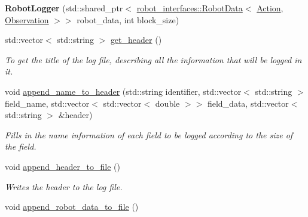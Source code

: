 \begin{DoxyCompactItemize}
\item 
{\bfseries Robot\+Logger} (std\+::shared\+\_\+ptr$<$ \hyperlink{classrobot__interfaces_1_1RobotData}{robot\+\_\+interfaces\+::\+Robot\+Data}$<$ \hyperlink{classAction}{Action}, \hyperlink{classObservation}{Observation} $>$$>$ robot\+\_\+data, int block\+\_\+size)\hypertarget{classrobot__interfaces_1_1RobotLogger_a40fbf613d2fd5a54dfd71a0dde9da616}{}\label{classrobot__interfaces_1_1RobotLogger_a40fbf613d2fd5a54dfd71a0dde9da616}

\item 
std\+::vector$<$ std\+::string $>$ \hyperlink{classrobot__interfaces_1_1RobotLogger_aff9a4e9a91b3fe604bd16a94a006e151}{get\+\_\+header} ()
\begin{DoxyCompactList}\small\item\em To get the title of the log file, describing all the information that will be logged in it. \end{DoxyCompactList}\item 
void \hyperlink{classrobot__interfaces_1_1RobotLogger_a7c94db4517002755f3325c13aa430733}{append\+\_\+name\+\_\+to\+\_\+header} (std\+::string identifier, std\+::vector$<$ std\+::string $>$ field\+\_\+name, std\+::vector$<$ std\+::vector$<$ double $>$$>$ field\+\_\+data, std\+::vector$<$ std\+::string $>$ \&header)
\begin{DoxyCompactList}\small\item\em Fills in the name information of each field to be logged according to the size of the field. \end{DoxyCompactList}\item 
void \hyperlink{classrobot__interfaces_1_1RobotLogger_a8c7c9b7bff6e49b340c90b36bee9331e}{append\+\_\+header\+\_\+to\+\_\+file} ()\hypertarget{classrobot__interfaces_1_1RobotLogger_a8c7c9b7bff6e49b340c90b36bee9331e}{}\label{classrobot__interfaces_1_1RobotLogger_a8c7c9b7bff6e49b340c90b36bee9331e}

\begin{DoxyCompactList}\small\item\em Writes the header to the log file. \end{DoxyCompactList}\item 
void \hyperlink{classrobot__interfaces_1_1RobotLogger_ac568cd79a651c2c20fa9e1f136155ced}{append\+\_\+robot\+\_\+data\+\_\+to\+\_\+file} ()\hypertarget{classrobot__interfaces_1_1RobotLogger_ac568cd79a651c2c20fa9e1f136155ced}{}\label{classrobot__interfaces_1_1RobotLogger_ac568cd79a651c2c20fa9e1f136155ced}


\end{DoxyCompactItemize}
